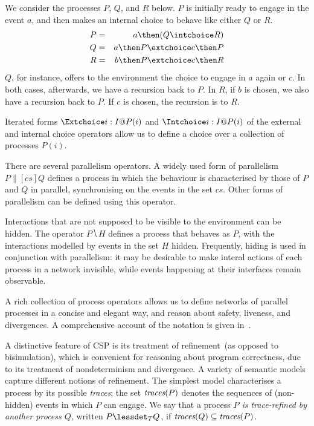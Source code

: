 \begin{example}\label{example:CSP}
  We consider the processes $P$, $Q$, and $R$ below. $P$ is initially
  ready to engage in the event $a$, and then makes an internal  choice to
  behave like either $Q$ or $R$.
  \begin{eqnarray*}
  P & = & a \then (Q\intchoice R)
  \\
  Q & = & a \then P \extchoice c \then P
  \\
  R & = & b \then P \extchoice c \then R
  \end{eqnarray*}
  $Q$, for instance, offers to the environment the choice to engage in $a$
  again or $c$. In both cases, afterwards, we have a recursion back to $P$.
  In $R$, if $b$ is chosen, we also have a recursion back to $P$. If $c$ is
  chosen, the recursion is to $R$.
  \xbox
\end{example}
%
Iterated forms $\Extchoice i: I @ P(i)$ and $\Intchoice i: I @ P(i)$ of the
external and internal choice operators allow us to define a choice over a
collection of processes $P(i)$.

There are several parallelism operators. A widely used form of parallelism $P
\parallel[cs] Q$ defines a process in which the behaviour is characterised by
those of $P$ and $Q$ in parallel, synchronising on the events in the set
$cs$. Other forms of parallelism can be defined using this operator.

Interactions that are not supposed to be visible to the environment can be
hidden. The operator $P \hide H$ defines a process that behaves as $P$, with the
interactions modelled by events in the set $H$ hidden. Frequently, hiding is used
in conjunction with parallelism: it may be desirable to make interal actions of each process in a network invisible, while events happening at their interfaces remain observable.


A rich collection of process operators allows us to define networks of
parallel processes in a concise and elegant way, and reason about safety,
liveness, and divergences.  A comprehensive account of the notation is given
in~\cite{Roscoe2010}.

A distinctive feature of CSP is its treatment of refinement~(as opposed to
bisimulation), which is convenient for reasoning about program correctness,
due to its treatment of nondeterminism and divergence.  A variety of semantic
models capture different notions of refinement. The simplest model
characterises a process by its possible \emph{traces}; the set $\text{\it traces}(P)$ denotes
 the sequences of (non-hidden) 
events in which
$P$ can engage.  We say that a process \emph{$P$ is trace-refined by another process
$Q$}, written $P \lessdet_T Q$, if $\text{\it traces}(Q)\subseteq \text{\it traces}(P)$. 


